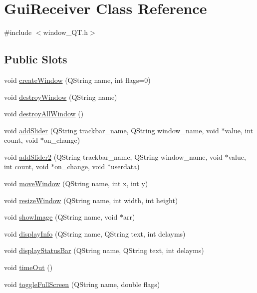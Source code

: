 \hypertarget{classGuiReceiver}{
\section{GuiReceiver Class Reference}
\label{classGuiReceiver}
}


{\ttfamily \#include $<$window\_\-QT.h$>$}

\subsection*{Public Slots}
\begin{DoxyCompactItemize}
\item 
void \hyperlink{classGuiReceiver_a59873b996659d0bb92d09638902ec4dc}{createWindow} (QString name, int flags=0)
\item 
void \hyperlink{classGuiReceiver_a86942e372e278c27c98af1930d9b9e97}{destroyWindow} (QString name)
\item 
void \hyperlink{classGuiReceiver_a748313239bdf5a50cc877dd91b3c1950}{destroyAllWindow} ()
\item 
void \hyperlink{classGuiReceiver_a8bd54a4f6d6f56083c2146173be6a1e3}{addSlider} (QString trackbar\_\-name, QString window\_\-name, void $\ast$value, int count, void $\ast$on\_\-change)
\item 
void \hyperlink{classGuiReceiver_a02ddc77f4583508363df717fd0859786}{addSlider2} (QString trackbar\_\-name, QString window\_\-name, void $\ast$value, int count, void $\ast$on\_\-change, void $\ast$userdata)
\item 
void \hyperlink{classGuiReceiver_abb7e0a41c2db119bfd76906651feb5aa}{moveWindow} (QString name, int x, int y)
\item 
void \hyperlink{classGuiReceiver_a42b8802376fe8f63922969475875eea6}{resizeWindow} (QString name, int width, int height)
\item 
void \hyperlink{classGuiReceiver_a185d6468377d45e2a2589bbb64a9ec62}{showImage} (QString name, void $\ast$arr)
\item 
void \hyperlink{classGuiReceiver_a1e010c3db9ebaaf1efddb8c03f558e88}{displayInfo} (QString name, QString text, int delayms)
\item 
void \hyperlink{classGuiReceiver_abfc7c7fb831a8c423a7a15e2b0ec994b}{displayStatusBar} (QString name, QString text, int delayms)
\item 
void \hyperlink{classGuiReceiver_aa8aab548c6a8fb1463c6cc7eb133ce7c}{timeOut} ()
\item 
void \hyperlink{classGuiReceiver_a50571c44603479d7d96426b1de23b010}{toggleFullScreen} (QString name, double flags)

\end{DoxyCompactItemize}
